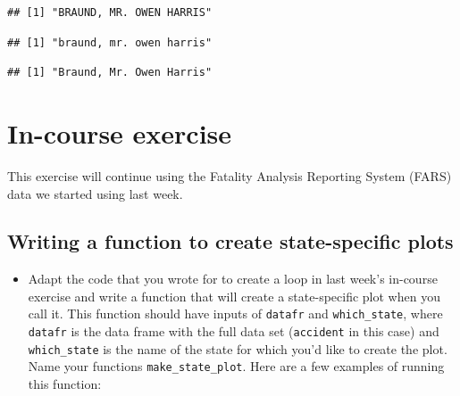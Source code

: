 \documentclass[]{book}
\makeatletter
\newenvironment{Shaded}{\begin{snugshade}}{\end{snugshade}}
\newcommand{\KeywordTok}[1]{\textcolor[rgb]{0.13,0.29,0.53}{\textbf{{#1}}}}
\newcommand{\DecValTok}[1]{\textcolor[rgb]{0.00,0.00,0.81}{{#1}}}
\newcommand{\NormalTok}[1]{{#1}}
\providecommand{\tightlist}{%
  \setlength{\itemsep}{0pt}\setlength{\parskip}{0pt}}
\newenvironment{kframe}{%
\medskip{}
\setlength{\fboxsep}{.8em}
 \def\at@end@of@kframe{}%
 \ifinner\ifhmode%
  \def\at@end@of@kframe{\end{minipage}}%
  \begin{minipage}{\columnwidth}%
 \fi\fi%
 \def\FrameCommand##1{\hskip\@totalleftmargin \hskip-\fboxsep
 \colorbox{shadecolor}{##1}\hskip-\fboxsep
     \hskip-\linewidth \hskip-\@totalleftmargin \hskip\columnwidth}%
 \MakeFramed {\advance\hsize-\width
   \@totalleftmargin\z@ \linewidth\hsize
   \@setminipage}}%
 {\par\unskip\endMakeFramed%
 \at@end@of@kframe}
\renewenvironment{Shaded}{\begin{kframe}}{\end{kframe}}
\makeatother
\begin{document}
\begin{verbatim}
## [1] "BRAUND, MR. OWEN HARRIS"
\end{verbatim}

\begin{Shaded}
\end{Shaded}

\begin{verbatim}
## [1] "braund, mr. owen harris"
\end{verbatim}

\begin{Shaded}
\end{Shaded}

\begin{verbatim}
## [1] "Braund, Mr. Owen Harris"
\end{verbatim}

\section{In-course exercise}\label{in-course-exercise-7}

This exercise will continue using the Fatality Analysis Reporting System
(FARS) data we started using last week.

\subsection{Writing a function to create state-specific
plots}\label{writing-a-function-to-create-state-specific-plots}

\begin{itemize}
\tightlist
\item
  Adapt the code that you wrote for to create a loop in last week's
  in-course exercise and write a function that will create a
  state-specific plot when you call it. This function should have inputs
  of \texttt{datafr} and \texttt{which\_state}, where \texttt{datafr} is
  the data frame with the full data set (\texttt{accident} in this case)
  and \texttt{which\_state} is the name of the state for which you'd
  like to create the plot. Name your functions
  \texttt{make\_state\_plot}. Here are a few examples of running this
  function:
\end{itemize}
\end{document}
